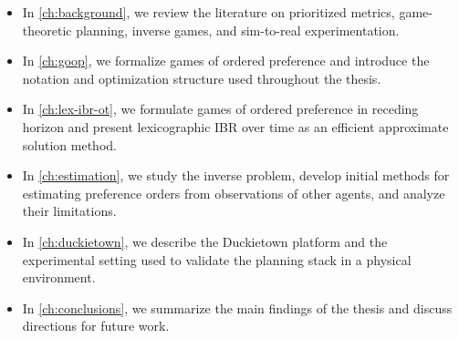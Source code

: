 \begin{itemize}
    \item In \cref{ch:background}, we review the literature on prioritized metrics, game-theoretic planning, inverse games, and sim-to-real experimentation.
    \item In \cref{ch:goop}, we formalize games of ordered preference and introduce the notation and optimization structure used throughout the thesis.
    \item In \cref{ch:lex-ibr-ot}, we formulate games of ordered preference in receding horizon and present lexicographic IBR over time as an efficient approximate solution method.
    \item In \cref{ch:estimation}, we study the inverse problem, develop initial methods for estimating preference orders from observations of other agents, and analyze their limitations.
    \item In \cref{ch:duckietown}, we describe the Duckietown platform and the experimental setting used to validate the planning stack in a physical environment.
    \item In \cref{ch:conclusions}, we summarize the main findings of the thesis and discuss directions for future work.
\end{itemize}
